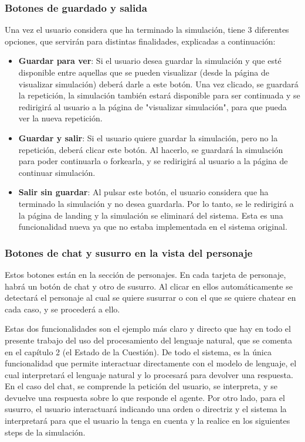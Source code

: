 \subsubsection{Botones de guardado y salida}

Una vez el usuario considera que ha terminado la simulación, tiene 3 diferentes opciones, que servirán para distintas finalidades, explicadas a continuación:

\begin{itemize}
	
	\item \textbf{Guardar para ver}: Si el usuario desea guardar la simulación y que esté disponible entre aquellas que se pueden visualizar (desde la página de visualizar simulación) deberá darle a este botón. Una vez clicado, se guardará la repetición, la simulación también estará disponible para ser continuada y se redirigirá al usuario a la página de "visualizar simulación", para que pueda ver la nueva repetición.
	
	\item \textbf{Guardar y salir}: Si el usuario quiere guardar la simulación, pero no la repetición, deberá clicar este botón. Al hacerlo, se guardará la simulación para poder continuarla o forkearla, y se redirigirá al usuario a la página de continuar simulación.
	
	\item \textbf{Salir sin guardar}: Al pulsar este botón, el usuario considera que ha terminado la simulación y no desea guardarla. Por lo tanto, se le redirigirá a la página de landing y la simulación se eliminará del sistema. Esta es una funcionalidad nueva ya que no estaba implementada en el sistema original.

\end{itemize}

\subsubsection{Botones de chat y susurro en la vista del personaje}
\label{botonSusurro}

Estos botones están en la sección de personajes. En cada tarjeta de personaje, habrá un botón de chat y otro de susurro. Al clicar en ellos automáticamente se detectará el personaje al cual se quiere susurrar o con el que se quiere chatear en cada caso, y se procederá a ello.

Estas dos funcionalidades son el ejemplo más claro y directo que hay en todo el presente trabajo del uso del procesamiento del lenguaje natural, que se comenta en el capítulo 2 (el Estado de la Cuestión). De todo el sistema, es la única funcionalidad que permite interactuar directamente con el modelo de lenguaje, el cual interpretará el lenguaje natural y lo procesará para devolver una respuesta. En el caso del chat, se comprende la petición del usuario, se interpreta, y se devuelve una respuesta sobre lo que responde el agente. Por otro lado, para el susurro, el usuario interactuará indicando una orden o directriz y el sistema la interpretará para que el usuario la tenga en cuenta y la realice en los siguientes steps de la simulación.

